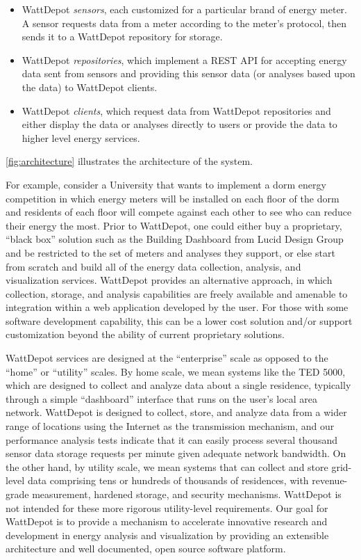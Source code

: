 \documentclass[conference]{IEEEtran}
\begin{document}
\begin{itemize}
\item WattDepot {\em sensors}, each customized for a particular brand of
energy meter.  A sensor requests data from a meter according to the meter's
protocol, then sends it to a WattDepot repository for storage.

\item WattDepot {\em repositories}, which implement a REST \cite{REST} API
for accepting energy data sent from sensors and providing this sensor data
(or analyses based upon the data) to WattDepot clients.

\item WattDepot {\em clients}, which request data from WattDepot
repositories and either display the data or analyses directly to users or
provide the data to higher level energy services.
\end{itemize}

\figurename \ref{fig:architecture} illustrates the architecture of the system.


For example, consider a University that wants to implement a dorm energy
competition in which energy meters will be installed on each floor of the
dorm and residents of each floor will compete against each other to see who
can reduce their energy the most.  Prior to WattDepot, one could either buy a
proprietary, ``black box'' solution such as the Building Dashboard from
Lucid Design Group and be restricted to the set of meters and analyses they
support, or else start from scratch and build all of the energy data
collection, analysis, and visualization services.  WattDepot provides an
alternative approach, in which collection, storage, and analysis
capabilities are freely available and amenable to integration within a web
application developed by the user.  For those with some software
development capability, this can be a lower cost solution and/or support
customization beyond the ability of current proprietary solutions.

WattDepot services are designed at the ``enterprise'' scale as opposed to
the ``home'' or ``utility'' scales.  By home scale, we mean systems like
the TED 5000, which are designed to collect and analyze data about a single
residence, typically through a simple ``dashboard'' interface that runs on
the user's local area network.  WattDepot is designed to
collect, store, and analyze data from a wider range of locations using the
Internet as the transmission mechanism, and our performance analysis tests
indicate that it can easily process several thousand sensor data storage
requests per minute given adequate network bandwidth.  On the other hand,
by utility scale, we mean systems that can collect and store grid-level
data comprising tens or hundreds of thousands of residences, with
revenue-grade measurement, hardened storage, and security mechanisms.
WattDepot is not intended for these more rigorous utility-level
requirements.  Our goal for WattDepot is to provide a mechanism to
accelerate innovative research and development in energy analysis and
visualization by providing an extensible architecture and well documented,
open source software platform.
\end{document}
